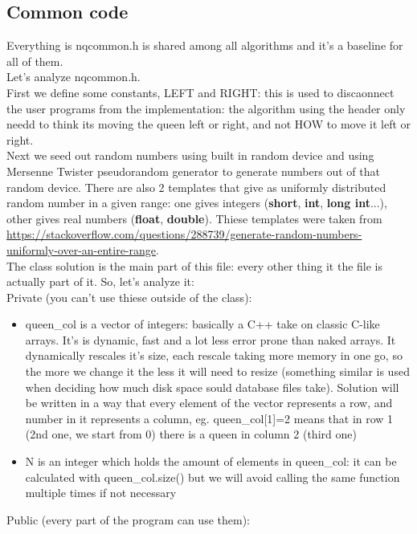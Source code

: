 \documentclass[10pt,a4paper]{article}
\begin{document}
		\subsection{Common code}
			Everything is nqcommon.h is shared among all algorithms and it's a baseline for all of them.\\
			Let's analyze nqcommon.h. \\
			First we define some constants, LEFT and RIGHT: this is used to discaonnect the user programs from the implementation: the algorithm using the header only needd to think its moving the queen left or right, and not HOW to move it left or right. \\
			Next we seed out random numbers using built in random device and using Mersenne Twister pseudorandom generator to generate numbers out of that random device. There are also 2 templates that give as uniformly distributed random number in a given range: one gives integers (\textbf{short}, \textbf{int}, \textbf{long int}...), other gives real numbers (\textbf{float}, \textbf{double}). Thiese templates were taken from \url{https://stackoverflow.com/questions/288739/generate-random-numbers-uniformly-over-an-entire-range}.\\
			The class solution is the main part of this file: every other thing it the file is actually part of it. So, let's analyze it: \\
			Private (you can't use thiese outside of the class):
			\begin{itemize}
				\item queen\_col is a vector of integers: basically a C++ take on classic C-like arrays. It's is dynamic, fast and a lot less error prone than naked arrays. It dynamically rescales it's size, each rescale taking more memory in one go, so the more we change it the less it will need to resize (something similar is used when deciding how much disk space sould database files take). Solution will be written in a way that every element of the vector represents a row, and number in it represents a column, eg. queen\_col[1]=2 means that in row 1 (2nd one, we start from 0) there is a queen in column 2 (third one)
				\item N is an integer which holds the amount of elements in queen\_col: it can be calculated with queen\_col.size() but we will avoid calling the same function multiple times if not necessary
			\end{itemize}
			Public (every part of the program can use them):
\end{document}
